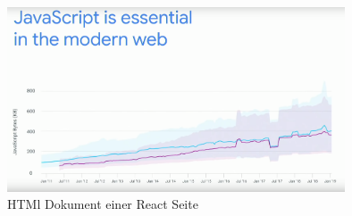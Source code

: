 \documentclass[runningheads]{llncs}
\begin{document}
\begin{figure}
  \centering
  \includegraphics[width=10cm]{images/JavaScriptGoogleShips}
  \caption{HTMl Dokument einer React Seite}
\end{figure}




\newpage
%


\end{document}
